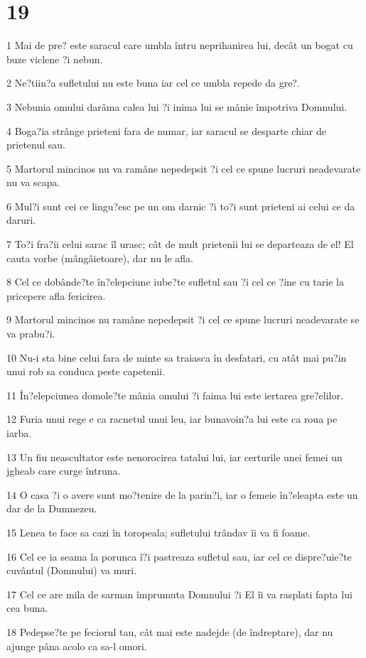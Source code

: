 \chapter{19}

\par 1 Mai de pre? este saracul care umbla întru neprihanirea lui, decât un bogat cu buze viclene ?i nebun.
\par 2 Ne?tiin?a sufletului nu este buna iar cel ce umbla repede da gre?.
\par 3 Nebunia omului darâma calea lui ?i inima lui se mânie împotriva Domnului.
\par 4 Boga?ia strânge prieteni fara de numar, iar saracul se desparte chiar de prietenul sau.
\par 5 Martorul mincinos nu va ramâne nepedepsit ?i cel ce spune lucruri neadevarate nu va scapa.
\par 6 Mul?i sunt cei ce lingu?esc pe un om darnic ?i to?i sunt prieteni ai celui ce da daruri.
\par 7 To?i fra?ii celui sarac îl urasc; cât de mult prietenii lui se departeaza de el! El cauta vorbe (mângâietoare), dar nu le afla.
\par 8 Cel ce dobânde?te în?elepciune iube?te sufletul sau ?i cel ce ?ine cu tarie la pricepere afla fericirea.
\par 9 Martorul mincinos nu ramâne nepedepsit ?i cel ce spune lucruri neadevarate se va prabu?i.
\par 10 Nu-i sta bine celui fara de minte sa traiasca în desfatari, cu atât mai pu?in unui rob sa conduca peste capetenii.
\par 11 În?elepciunea domole?te mânia omului ?i faima lui este iertarea gre?elilor.
\par 12 Furia unui rege e ca racnetul unui leu, iar bunavoin?a lui este ca roua pe iarba.
\par 13 Un fiu neascultator este nenorocirea tatalui lui, iar certurile unei femei un jgheab care curge întruna.
\par 14 O casa ?i o avere sunt mo?tenire de la parin?i, iar o femeie în?eleapta este un dar de la Dumnezeu.
\par 15 Lenea te face sa cazi în toropeala; sufletului trândav îi va fi foame.
\par 16 Cel ce ia seama la porunca î?i pastreaza sufletul sau, iar cel ce dispre?uie?te cuvântul (Domnului) va muri.
\par 17 Cel ce are mila de sarman împrumuta Domnului ?i El îi va rasplati fapta lui cea buna.
\par 18 Pedepse?te pe feciorul tau, cât mai este nadejde (de îndreptare), dar nu ajunge pâna acolo ca sa-l omori.
